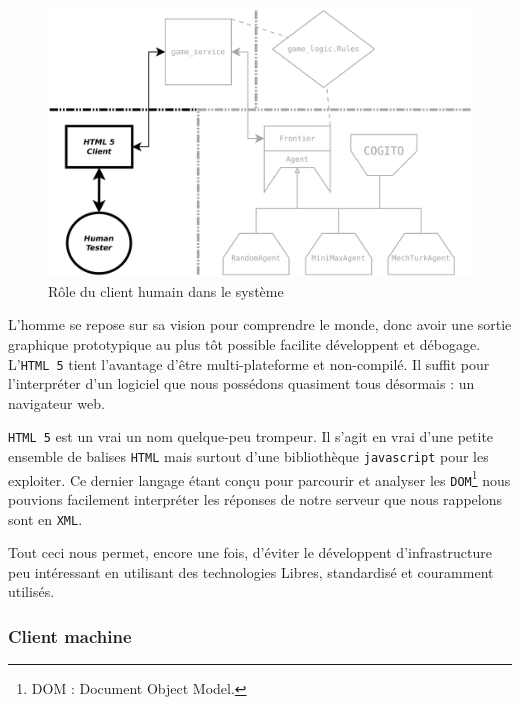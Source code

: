 \begin{figure}[H] 
\centering
\includegraphics[width=\textwidth]{files/william/archi_client_humain} 
\caption{Rôle du client humain dans le système} 
\end{figure} 

L'homme se repose sur sa vision pour comprendre le monde, donc avoir une sortie graphique prototypique au plus tôt possible facilite développent et débogage. L'\texttt{HTML 5} tient l'avantage d'être multi-plateforme et non-compilé. Il suffit pour l'interpréter d'un logiciel que nous possédons quasiment tous désormais : un navigateur web.

\og \texttt{HTML 5} \fg{} est un vrai un nom quelque-peu trompeur. Il s'agit en vrai d'une petite ensemble de balises \texttt{HTML} mais surtout d'une bibliothèque \texttt{javascript} pour les exploiter. Ce dernier langage étant conçu pour parcourir et analyser les \texttt{DOM}\footnote{DOM : Document Object Model. } nous pouvions facilement interpréter les réponses de notre serveur que nous rappelons sont en \texttt{XML}.

Tout ceci nous permet, encore une fois, d'éviter le développent d'infrastructure peu intéressant en utilisant des technologies Libres, standardisé et couramment utilisés.   

\subsubsection{Client machine}

